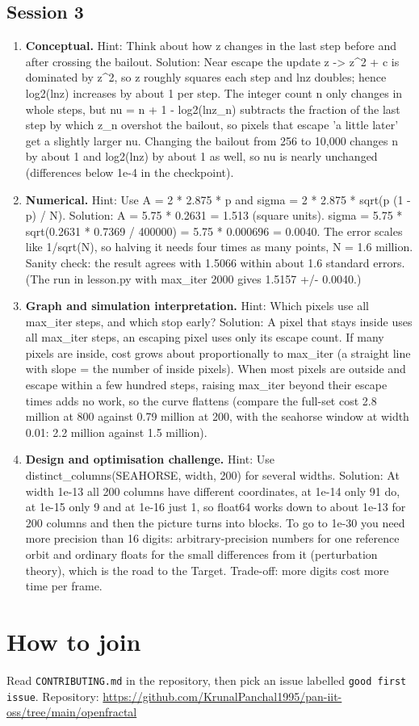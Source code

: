 \documentclass[11pt,a4paper]{article}
\begin{document}
\subsection*{Session 3}
\begin{enumerate}[nosep]
\item \textbf{Conceptual.} Hint: Think about how \textbar{}z\textbar{} changes in the last step before and after crossing the bailout. Solution: Near escape the update z -\textgreater{} z\textasciicircum{}2 + c is dominated by z\textasciicircum{}2, so \textbar{}z\textbar{} roughly squares each step and ln\textbar{}z\textbar{} doubles; hence log2(ln\textbar{}z\textbar{}) increases by about 1 per step. The integer count n only changes in whole steps, but nu = n + 1 - log2(ln\textbar{}z\_n\textbar{}) subtracts the fraction of the last step by which \textbar{}z\_n\textbar{} overshot the bailout, so pixels that escape 'a little later' get a slightly larger nu. Changing the bailout from 256 to 10,000 changes n by about 1 and log2(ln\textbar{}z\textbar{}) by about 1 as well, so nu is nearly unchanged (differences below 1e-4 in the checkpoint).
\item \textbf{Numerical.} Hint: Use A = 2 * 2.875 * p and sigma = 2 * 2.875 * sqrt(p (1 - p) / N). Solution: A = 5.75 * 0.2631 = 1.513 (square units). sigma = 5.75 * sqrt(0.2631 * 0.7369 / 400000) = 5.75 * 0.000696 = 0.0040. The error scales like 1/sqrt(N), so halving it needs four times as many points, N = 1.6 million. Sanity check: the result agrees with 1.5066 within about 1.6 standard errors. (The run in lesson.py with max\_iter 2000 gives 1.5157 +/- 0.0040.)
\item \textbf{Graph and simulation interpretation.} Hint: Which pixels use all max\_iter steps, and which stop early? Solution: A pixel that stays inside uses all max\_iter steps, an escaping pixel uses only its escape count. If many pixels are inside, cost grows about proportionally to max\_iter (a straight line with slope = the number of inside pixels). When most pixels are outside and escape within a few hundred steps, raising max\_iter beyond their escape times adds no work, so the curve flattens (compare the full-set cost 2.8 million at 800 against 0.79 million at 200, with the seahorse window at width 0.01: 2.2 million against 1.5 million).
\item \textbf{Design and optimisation challenge.} Hint: Use distinct\_columns(SEAHORSE, width, 200) for several widths. Solution: At width 1e-13 all 200 columns have different coordinates, at 1e-14 only 91 do, at 1e-15 only 9 and at 1e-16 just 1, so float64 works down to about 1e-13 for 200 columns and then the picture turns into blocks. To go to 1e-30 you need more precision than 16 digits: arbitrary-precision numbers for one reference orbit and ordinary floats for the small differences from it (perturbation theory), which is the road to the Target. Trade-off: more digits cost more time per frame.
\end{enumerate}

\section{How to join}
Read \texttt{CONTRIBUTING.md} in the repository, then pick an issue labelled \texttt{good first issue}. Repository: \url{https://github.com/KrunalPanchal1995/pan-iit-oss/tree/main/openfractal}
\end{document}
